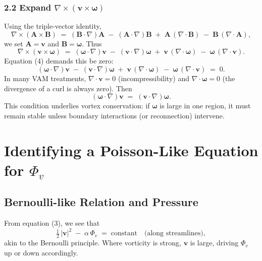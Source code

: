 \documentclass[aps,preprint,superscriptaddress]{revtex4-2}
\begin{document}
    \subsubsection*{2.2 Expand \(\nabla \times (\mathbf{v}\times \boldsymbol{\omega})\)}
    Using the triple-vector identity,
    \[
        \nabla \times (\mathbf{A}\times \mathbf{B})
        \;=\;
        (\mathbf{B}\cdot\nabla)\mathbf{A}
        \;-\;
        (\mathbf{A}\cdot\nabla)\mathbf{B}
        \;+\;
        \mathbf{A}\,(\nabla\cdot \mathbf{B})
        \;-\;
        \mathbf{B}\,(\nabla\cdot \mathbf{A}),
    \]
    we set \(\mathbf{A} = \mathbf{v}\) and \(\mathbf{B} = \boldsymbol{\omega}\). Thus
    \[
        \nabla \times (\mathbf{v}\times \boldsymbol{\omega})
        \;=\;
        (\boldsymbol{\omega}\cdot \nabla)\mathbf{v}
        \;-\;
        (\mathbf{v}\cdot \nabla)\boldsymbol{\omega}
        \;+\;
        \mathbf{v}\,(\nabla\cdot \boldsymbol{\omega})
        \;-\;
        \boldsymbol{\omega}\,(\nabla\cdot \mathbf{v}).
    \]
    Equation (4) demands this be zero:
    \[
        (\boldsymbol{\omega}\cdot \nabla)\mathbf{v}
        \;-\;
        (\mathbf{v}\cdot \nabla)\boldsymbol{\omega}
        \;+\;
        \mathbf{v}\,(\nabla\cdot \boldsymbol{\omega})
        \;-\;
        \boldsymbol{\omega}\,(\nabla\cdot \mathbf{v})
        \;=\;
        0.
        \tag{5}
    \]
    In many VAM treatments, \(\nabla \cdot \mathbf{v} = 0\) (incompressibility) and \(\nabla \cdot \boldsymbol{\omega} = 0\) (the divergence of a curl is always zero). Then
    \[
        (\boldsymbol{\omega}\cdot \nabla)\mathbf{v}
        \;=\;
        (\mathbf{v}\cdot \nabla)\boldsymbol{\omega}.
        \tag{6}
    \]
    This condition underlies vortex conservation: if \(\boldsymbol{\omega}\) is large in one region, it must remain stable unless boundary interactions (or reconnection) intervene.

    \section{Identifying a Poisson-Like Equation for \(\Phi_v\)}

    \subsection{Bernoulli-like Relation and Pressure}
    From equation (3), we see that
    \[
        \tfrac12\,|\mathbf{v}|^2
        \;-\;
        \alpha\,\Phi_v
        \;=\;
        \mathrm{constant}
        \quad
        \text{(along streamlines)},
    \]
    akin to the Bernoulli principle. Where vorticity is strong, \(\mathbf{v}\) is large, driving \(\Phi_v\) up or down accordingly.
\end{document}
